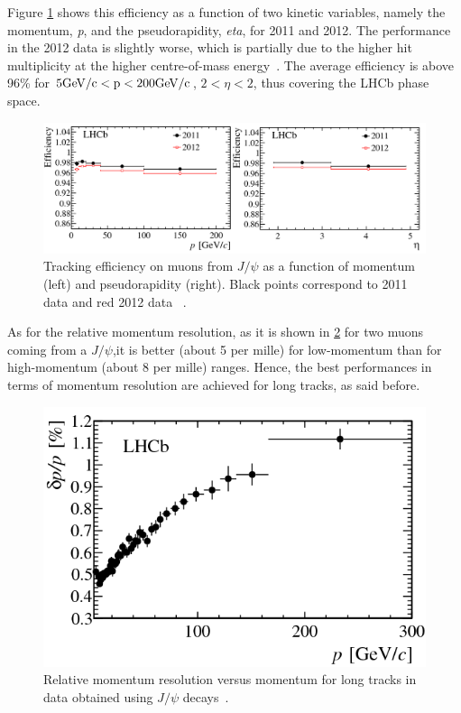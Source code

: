 Figure \ref{fig:lhcb_TrackEfficiency} shows this efficiency as a function of two kinetic variables, namely the momentum, \textit{p}, and the pseudorapidity, \textit{eta}, for 2011 and 2012. The performance in the 2012 data is slightly worse, which is partially due to the higher hit multiplicity at the higher centre-of-mass energy~\cite{Aaij:2014jba}. The average efficiency is above 96\% for $5 \rm GeV/c < p < 200 \rm GeV/c$, $2 < \eta < 2$, thus covering the LHCb phase space. 

\begin{figure} [htb!]
\begin{center}
\includegraphics[scale=0.5]{figs/Efficiency_p_eta.png}
\caption{Tracking efficiency on muons from $J/\psi$ as a function of momentum (left) and
pseudorapidity (right). Black points correspond to 2011 data and red 2012 data
~\cite{Aaij:2014jba}.\label{fig:lhcb_TrackEfficiency}}
\end{center}
\end{figure}

As for the relative momentum resolution, as it is shown in \ref{fig:lhcb_Resolution} for two muons coming from a $J/\psi$,it is better (about 5 per mille) for low-momentum than for high-momentum (about 8 per mille) ranges. Hence, the best performances in terms of momentum resolution are achieved for long tracks, as said before. 

\begin{figure} [htb!]
\begin{center}
\includegraphics[scale=0.5]{figs/Resolution_p.png}
\caption{Relative momentum resolution versus momentum for long tracks in data obtained using $J/\psi$ decays~\cite{Aaij:2014jba}.\label{fig:lhcb_Resolution}}
\end{center}
\end{figure}

